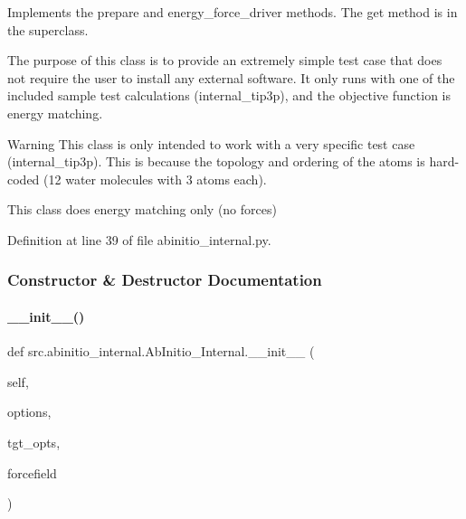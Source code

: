 Implements the prepare and energy\+\_\+force\+\_\+driver methods. The get method is in the superclass.

The purpose of this class is to provide an extremely simple test case that does not require the user to install any external software. It only runs with one of the included sample test calculations (internal\+\_\+tip3p), and the objective function is energy matching.

\begin{DoxyWarning}{Warning}
This class is only intended to work with a very specific test case (internal\+\_\+tip3p). This is because the topology and ordering of the atoms is hard-\/coded (12 water molecules with 3 atoms each).

This class does energy matching only (no forces) 
\end{DoxyWarning}


Definition at line 39 of file abinitio\+\_\+internal.\+py.



\subsubsection{Constructor \& Destructor Documentation}
\mbox{\label{classsrc_1_1abinitio__internal_1_1AbInitio__Internal_a51e97c29918e5b7cedf4cffbc4ccb675}} 
\paragraph{\texorpdfstring{\+\_\+\+\_\+init\+\_\+\+\_\+()}{\_\_init\_\_()}}
{\footnotesize\ttfamily def src.\+abinitio\+\_\+internal.\+Ab\+Initio\+\_\+\+Internal.\+\_\+\+\_\+init\+\_\+\+\_\+ (\begin{DoxyParamCaption}\item[{}]{self,  }\item[{}]{options,  }\item[{}]{tgt\+\_\+opts,  }\item[{}]{forcefield }\end{DoxyParamCaption})}



